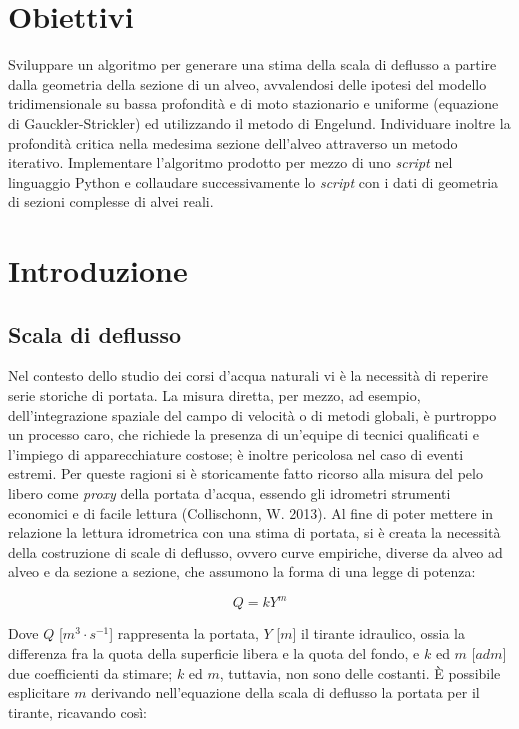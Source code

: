 \documentclass[12pt]{article} %
\begin{document}
\newpage
\thispagestyle{empty}
\tableofcontents
\newpage
\listoffigures
\newpage

\section{Obiettivi}
\noindent Sviluppare un algoritmo per generare una stima della scala di deflusso a partire dalla geometria della sezione di un alveo, avvalendosi delle ipotesi del modello tridimensionale su bassa profondità e di moto stazionario e uniforme (equazione di Gauckler-Strickler) ed utilizzando il metodo di Engelund. Individuare inoltre la profondità critica nella medesima sezione dell’alveo attraverso un metodo iterativo. Implementare l’algoritmo prodotto per mezzo di uno \textit{script} nel linguaggio Python e collaudare successivamente lo \textit{script} con i dati di geometria di sezioni complesse di alvei reali.

\newpage
\section{Introduzione}
\subsection{Scala di deflusso}
\noindent Nel contesto dello studio dei corsi d’acqua naturali vi è la necessità di reperire serie storiche di portata. La misura diretta, per mezzo, ad esempio, dell’integrazione spaziale del campo di velocità o di metodi globali, è purtroppo un processo caro, che richiede la presenza di un’equipe di tecnici qualificati e l’impiego di apparecchiature costose; è inoltre pericolosa nel caso di eventi estremi. 
Per queste ragioni si è storicamente fatto ricorso alla misura del pelo libero come \textit{proxy} della portata d’acqua, essendo gli idrometri strumenti economici e di facile lettura (Collischonn, W. 2013).
Al fine di poter mettere in relazione la lettura idrometrica con una stima di portata, si è creata la necessità della costruzione di scale di deflusso, ovvero curve empiriche, diverse da alveo ad alveo e da sezione a sezione, che assumono la forma di una legge di potenza: 

\begin{equation}
    Q=kY^m
    \label{eqn:scala_deflusso}
\end{equation}

\noindent Dove $Q$ [$m^3\cdot s^{-1}$]  rappresenta la portata, $Y$ [$m$] il tirante idraulico, ossia la differenza fra la quota della superficie libera e la quota del fondo, e $k$ ed $m$ [$adm]$ due coefficienti da stimare; $k$ ed $m$, tuttavia, non sono delle costanti. È possibile esplicitare $m$ derivando nell’equazione della scala di deflusso la portata per il tirante, ricavando così: 
\end{document}
